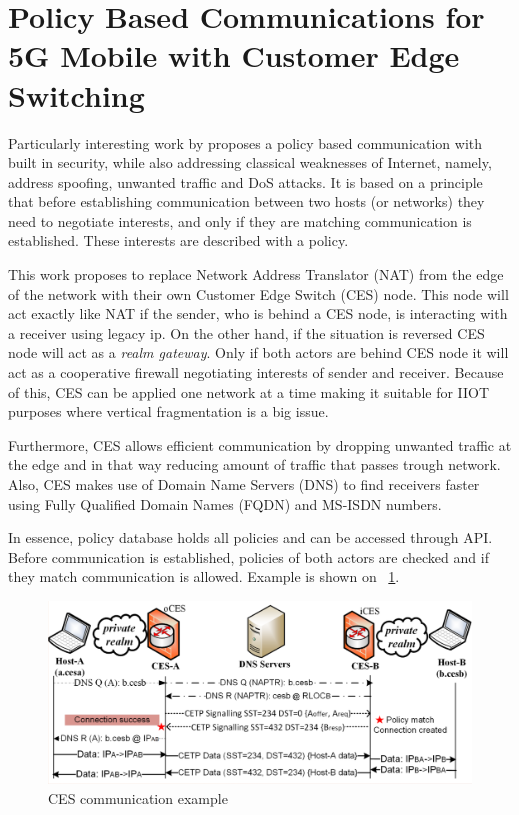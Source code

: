 \section{Policy Based Communications for 5G Mobile with Customer Edge Switching}
\label{CES}

Particularly interesting work by \cite{Kantola} proposes a policy based communication with built in security, while also addressing classical weaknesses of Internet, namely, address spoofing, unwanted traffic and DoS attacks. It is based on a principle that before establishing communication between two hosts (or networks) they need to negotiate interests, and only if they are matching communication is established. These interests are described with a policy.

This work proposes to replace Network Address Translator (NAT) from the edge of the network with their own Customer Edge Switch (CES) node. This node will act exactly like NAT if the sender, who is behind a CES node, is interacting with a receiver using legacy ip. On the other hand, if the situation is reversed CES node will act as a \emph{realm gateway}. Only if both actors are behind CES node it will act as a cooperative firewall negotiating interests of sender and receiver. Because of this, CES can be applied one network at a time making it suitable for IIOT purposes where vertical fragmentation is a big issue.

Furthermore, CES allows efficient communication by dropping unwanted traffic at the edge and in that way reducing amount of traffic that passes trough network. Also, CES makes use of Domain Name Servers (DNS) to find receivers faster using Fully Qualified Domain Names (FQDN) and MS-ISDN numbers.

In essence, policy database holds all policies and can be accessed through API. Before communication is established, policies of both actors are checked and if they match communication is allowed. Example is shown on ~\ref{fig:PolicyBasedCommunicationExample}.

\begin{figure}[ht]
	\begin{center}
		\includegraphics[width=\textwidth]{images/PolicyBasedCommunicationExample}
		\caption{CES communication example}
		\label{fig:PolicyBasedCommunicationExample}
	\end{center}
\end{figure}
